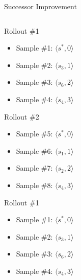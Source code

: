 \documentclass[10pt]{beamer}
\begin{document}
\begin{frame}{Successor Improvement}
\begin{columns}
\begin{column}{0.5\textwidth}
 {
    Rollout \#1
    \begin{itemize}
        \item Sample \#1: $\langle s^*, 0 \rangle$
        \item Sample \#2: $\langle s_3, 1 \rangle$
        \item Sample \#3: $\langle s_6, 2 \rangle$
        \item Sample \#4: $\langle s_4, 3 \rangle$
    \end{itemize}
}
 {
    Rollout \#2
    \begin{itemize}
        \item Sample \#5: $\langle s^*, 0 \rangle$
        \item Sample \#6: $\langle s_1, 1 \rangle$
        \item Sample \#7: $\langle s_2, 2 \rangle$
        \item Sample \#8: $\langle s_4, 3 \rangle$
    \end{itemize}
}
 {
    Rollout \#1
    \begin{itemize}
        \item Sample \#1: $\langle s^*, 0 \rangle$
        \item Sample \#2: $\langle s_3, 1 \rangle$
        \item Sample \#3: $\langle s_6, 2 \rangle$
        \item Sample \#4: $\langle s_4, 3 \rangle$
    \end{itemize}
    \bigskip

}
\end{column}
\end{columns}
\end{frame}
\end{document}
